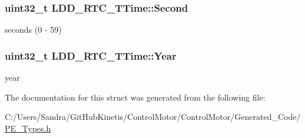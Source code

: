 \subsubsection[{\texorpdfstring{Second}{Second}}]{\setlength{\rightskip}{0pt plus 5cm}uint32\+\_\+t L\+D\+D\+\_\+\+R\+T\+C\+\_\+\+T\+Time\+::\+Second}\hypertarget{struct_l_d_d___r_t_c___t_time_ab6c770706c18542e856d56398850ac9e}{}\label{struct_l_d_d___r_t_c___t_time_ab6c770706c18542e856d56398850ac9e}
seconds (0 -\/ 59) 
\subsubsection[{\texorpdfstring{Year}{Year}}]{\setlength{\rightskip}{0pt plus 5cm}uint32\+\_\+t L\+D\+D\+\_\+\+R\+T\+C\+\_\+\+T\+Time\+::\+Year}\hypertarget{struct_l_d_d___r_t_c___t_time_a16fbfb74b239e4b5e1889fe19d025d5e}{}\label{struct_l_d_d___r_t_c___t_time_a16fbfb74b239e4b5e1889fe19d025d5e}
year 

The documentation for this struct was generated from the following file\+:\begin{DoxyCompactItemize}
\item 
C\+:/\+Users/\+Sandra/\+Git\+Hub\+Kinetis/\+Control\+Motor/\+Control\+Motor/\+Generated\+\_\+\+Code/\hyperlink{_p_e___types_8h}{P\+E\+\_\+\+Types.\+h}\end{DoxyCompactItemize}
